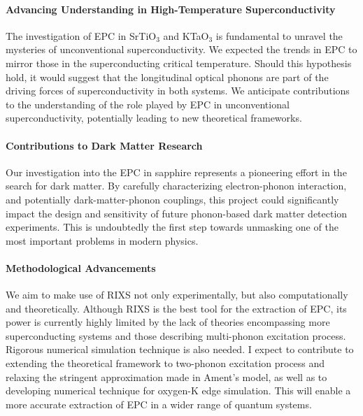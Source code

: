 \documentclass[11pt]{article}
\begin{document}
\paragraph{Advancing Understanding in High-Temperature Superconductivity}
The investigation of EPC in SrTiO$_{3}$ and KTaO$_{3}$ is fundamental to unravel the mysteries of unconventional superconductivity.  We expected the trends in EPC to mirror those in the superconducting critical temperature. Should this hypothesis hold, it would suggest that the longitudinal optical phonons are part of the driving forces of superconductivity in both systems. We anticipate contributions to the understanding of the role played by EPC in unconventional superconductivity, potentially leading to new theoretical frameworks. 

\paragraph{Contributions to Dark Matter Research}
Our investigation into the EPC in sapphire represents a pioneering effort in the search for dark matter. By carefully characterizing electron-phonon interaction, and potentially dark-matter-phonon couplings, this project could significantly impact the design and sensitivity of future phonon-based dark matter detection experiments. 
This is undoubtedly the first step towards unmasking one of the most important problems in modern physics.

\paragraph{Methodological Advancements}
We aim to make use of RIXS not only experimentally, but also computationally and theoretically. Although RIXS is the best tool for the extraction of EPC, its power is currently highly limited by the lack of theories encompassing more superconducting systems and those describing multi-phonon excitation process. Rigorous numerical simulation technique is also needed. I expect to contribute to extending the theoretical framework to two-phonon excitation process and relaxing the stringent approximation made in Ament's model\cite{ament_resonant_2011}, as well as to developing numerical technique for oxygen-K edge simulation. This will enable a more accurate extraction of EPC in a wider range of quantum systems. 



\newpage


\end{document}
